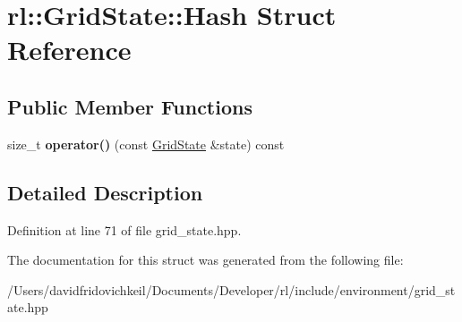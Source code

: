 \hypertarget{structrl_1_1_grid_state_1_1_hash}{}\section{rl\+:\+:Grid\+State\+:\+:Hash Struct Reference}
\label{structrl_1_1_grid_state_1_1_hash}
\subsection*{Public Member Functions}
\begin{DoxyCompactItemize}
\item 
\hypertarget{structrl_1_1_grid_state_1_1_hash_a45f7e666d08533a618f8ac3188702599}{}\label{structrl_1_1_grid_state_1_1_hash_a45f7e666d08533a618f8ac3188702599} 
size\+\_\+t {\bfseries operator()} (const \hyperlink{structrl_1_1_grid_state}{Grid\+State} \&state) const
\end{DoxyCompactItemize}


\subsection{Detailed Description}


Definition at line 71 of file grid\+\_\+state.\+hpp.



The documentation for this struct was generated from the following file\+:\begin{DoxyCompactItemize}
\item 
/\+Users/davidfridovichkeil/\+Documents/\+Developer/rl/include/environment/grid\+\_\+state.\+hpp\end{DoxyCompactItemize}
